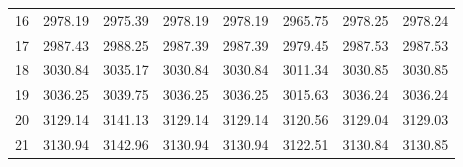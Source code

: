 \documentclass[10pt,oneside]{article}
\begin{document}
\begin{table}[h!]
\begin{tabular}{cccccccc}
16 &   2978.19 & 2975.39 & 2978.19 & 2978.19 &      2965.75 & 2978.25 & 2978.24 \\
17 &   2987.43 & 2988.25 & 2987.39 & 2987.39 &      2979.45 & 2987.53 & 2987.53 \\
18 &   3030.84 & 3035.17 & 3030.84 & 3030.84 &      3011.34 & 3030.85 & 3030.85 \\
19 &   3036.25 & 3039.75 & 3036.25 & 3036.25 &      3015.63 & 3036.24 & 3036.24 \\
20 &   3129.14 & 3141.13 & 3129.14 & 3129.14 &      3120.56 & 3129.04 & 3129.03 \\
21 &   3130.94 & 3142.96 & 3130.94 & 3130.94 &      3122.51 & 3130.84 & 3130.85 \\
\bottomrule
\end{tabular}
\end{table}

\clearpage
\end{document}
